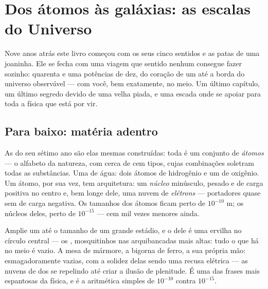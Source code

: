 \chapter{Dos átomos às galáxias: as escalas do Universo}\label{ch:g9:atoms-to-galaxies}

Nove anos atrás este livro começou com os seus cinco sentidos e as
patas de uma joaninha. Ele se fecha com uma viagem que sentido nenhum
consegue fazer sozinho: quarenta e uma potências de dez, do coração
de um  até a borda do universo observável --- com você, bem
exatamente, no meio. Um último capítulo, um último segredo devido de
uma velha piada, e uma escada onde se apoiar para toda a física que
está por vir.

\section{Para baixo: matéria adentro}

\begin{definition}[Átomos]\label{def:g9:atoms-to-galaxies:atom}
As  do seu sétimo ano são elas mesmas construídas: toda
 é um conjunto de \emph{átomos} --- o alfabeto
da natureza, com cerca de cem tipos, cujas combinações soletram todas
as substâncias. Uma  de água: dois átomos de hidrogênio e um
de oxigênio. Um átomo, por sua vez, tem arquitetura: um
\emph{núcleo} minúsculo, pesado e de carga positiva no
centro e, bem longe dele, uma nuvem de
\emph{elétrons} --- portadores quase sem  de carga
negativa. Os tamanhos dos átomos ficam perto de $10^{-10}$ \unit{m};
os núcleos deles, perto de $10^{-15}$ --- cem mil vezes menores
ainda.
\end{definition}

\begin{proposition}\label{prop:g9:atoms-to-galaxies:empty}
Amplie um  até o tamanho de um grande estádio, e o  dele é
uma ervilha no círculo central --- os , mosquitinhos nas
arquibancadas mais altas: tudo o que há no meio é vazio. A mesa de
mármore, a bigorna de ferro, a sua própria mão: esmagadoramente
vazias, com a solidez delas sendo uma recusa elétrica --- as nuvens
de  dos  se repelindo até criar a ilusão de plenitude.
É uma das frases mais espantosas da física, e é a aritmética simples
de $10^{-10}$ contra $10^{-15}$.
\end{proposition}

